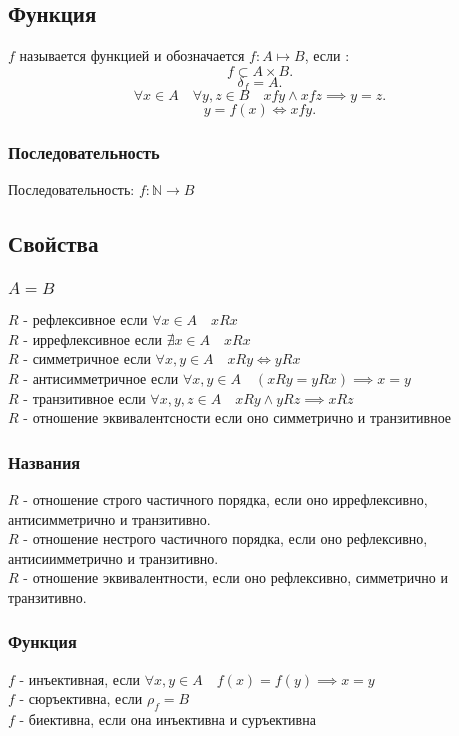 \documentclass[11pt, oneside]{article}   	%
\begin{document}
    \subsection{Функция}
        $f$ называется функцией и обозначается  $f: A \mapsto B$, если :
        \[ f \subset A \times B .\] 
        \[ \delta_f = A .\]
        \[ \forall{x \in A}\quad\forall{y, z \in B}\quad xfy\land xfz \implies y=z .\]
        \[ y=f(x) \iff xfy .\]
        \subsubsection{Последовательность}
            Последовательность: $f : \mathbb{N} \to B$ 

    \subsection{Свойства}
        \subsubsection{$A = B$}
            $R$ - рефлексивное если  $\forall{x \in A}\quad xRx$\\ 
            $R$ -  иррефлексивное если $\nexists{x \in A}\quad xRx$\\
            $R$ - симметричное если  $\forall{x, y \in A}\quad xRy \iff yRx$\\
            $R$ - антисимметричное если  $\forall{x, y \in A}\quad \left(xRy = yRx\right) \implies x=y$ \\
            $R$ - транзитивное если $\forall{x, y, z \in A}\quad xRy\land yRz \implies xRz$\\
            $R$ - отношение эквивалентсности если оно симметрично и транзитивное\\
        \subsubsection{Названия}
            $R$ - отношение строго частичного порядка, если оно иррефлексивно, антисимметрично и транзитивно.\\
            $R$ - отношение нестрого частичного порядка, если оно рефлексивно, антисиимметрично и транзитивно.\\
            $R$ - отношение эквивалентности, если оно рефлексивно, симметрично и транзитивно.
        \subsubsection{Функция}
            $f$ - инъективная, если  $\forall{x, y \in A}\quad f(x) = f(y) \implies x = y$\\ 
            $f$ - сюръективна, если  $\rho_f = B$\\
            $f$ - биективна, если она инъективна и суръективна
\end{document}
